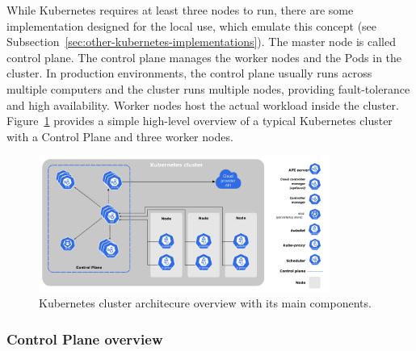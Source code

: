 While Kubernetes requires at least three nodes to run, there are some implementation designed for the local use, which emulate this concept (see Subsection~\ref{sec:other-kubernetes-implementations}). The master node is called control plane. The control plane manages the worker nodes and the Pods in the cluster. In production environments, the control plane usually runs across multiple computers and the cluster runs multiple nodes, providing fault-tolerance and high availability. Worker nodes host the actual workload inside the cluster. Figure~\ref{img:kubernetes-architecture} provides a simple high-level overview of a typical Kubernetes cluster with a Control Plane and three worker nodes.

\begin{figure}[!hbt]
	\begin{center}
		\includegraphics[width=0.85\textwidth]{images/components-of-kubernetes.pdf}
        \caption{Kubernetes cluster architecure overview with its main components.}
		\label{img:kubernetes-architecture}
	\end{center}
\end{figure}

\subsubsection*{Control Plane overview}

